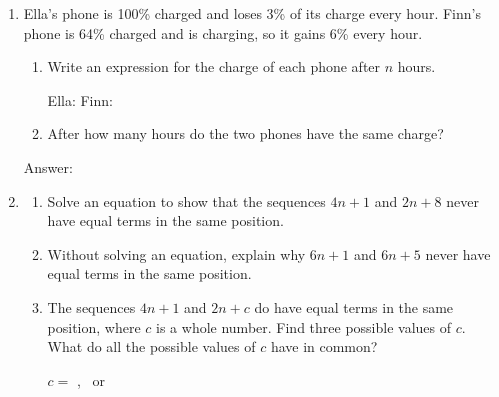 \documentclass[11pt,a4paper]{article}
\newcommand{\gap}{\underline{\hspace{0.95cm}}}
\newcommand{\ansline}[1][2.2cm]{\underline{\hspace{#1}}}
\newcommand{\workspace}[1]{\par\vspace{#1}\hfill Answer: \ansline[3.5cm]\par}
\newcommand{\battery}[3]{%
  \begin{scope}[shift={(#1,#2)}]
  \draw[line width=0.6pt,rounded corners=1.5pt] (0,0) rectangle (1.1,0.42);
  \fill (1.1,0.12) rectangle (1.17,0.30);
  \fill[gray!30] (0.05,0.05) rectangle ({0.05+0.01*#3},0.37);
  \node[font=\scriptsize] at (0.55,0.21) {#3\%};
  \end{scope}}
\begin{document}
\begin{enumerate}
\newpage
\item \begin{minipage}[t]{0.52\linewidth}
  Ella's phone is 100\% charged and loses 3\% of its charge every hour. Finn's
  phone is 64\% charged and is charging, so it gains 6\% every hour.
  \begin{enumerate}
  \item Write an expression for the charge of each phone after $n$ hours.\par
    Ella: \ansline[2.2cm] \quad Finn: \ansline[2.2cm]
  \item After how many hours do the two phones have the same charge?
  \end{enumerate}
  \end{minipage}\hfill
  \begin{minipage}[t]{0.45\linewidth}\raggedleft\vspace{0pt}
  \end{minipage}
  \workspace{2.6cm}

\item
  \begin{enumerate}
  \item Solve an equation to show that the sequences $4n+1$ and $2n+8$ never have
    equal terms in the same position.\par\vspace{2.5cm}
  \item Without solving an equation, explain why $6n+1$ and $6n+5$ never have
    equal terms in the same position. \hrulefill\par\vspace{9pt}\hrulefill
  \item The sequences $4n+1$ and $2n+c$ do have equal terms in the same position,
    where $c$ is a whole number. Find three possible values of $c$. What do all the
    possible values of $c$ have in common?\par\vspace{6pt}
    $c=$ \gap, \gap\ or \gap \qquad \hrulefill
  \end{enumerate}
\end{enumerate}
\end{document}
